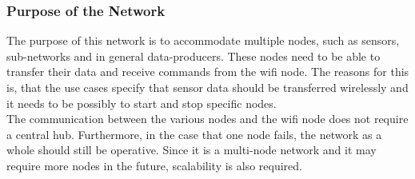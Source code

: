 \subsubsection{Purpose of the Network}
The purpose of this network is to accommodate multiple nodes, such as sensors, sub-networks and in general data-producers.
These nodes need to be able to transfer their data and receive commands from the wifi node.
The reasons for this is, that the use cases specify that sensor data should be transferred wirelessly and it needs to be possibly to start and stop specific nodes.
\\
The communication between the various nodes and the wifi node does not require a central hub.
Furthermore, in the case that one node fails, the network as a whole should still be operative.
Since it is a multi-node network and it may require more nodes in the future, scalability is also required.

